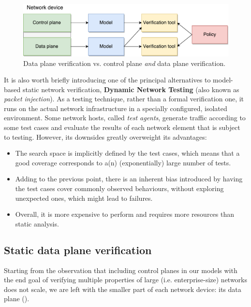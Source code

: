 \begin{figure}[h]
  \centering
  \captionsetup{justification=centering}
  \includegraphics[scale=0.5]{assets/img/control-data}
  \caption{Data plane verification vs. control plane \emph{and} data plane
  verification.}
  \label{fig:control-data-verif}
\end{figure}

It is also worth briefly introducing one of the principal alternatives to
model-based static network verification, \textbf{Dynamic Network Testing} (also
known as \emph{packet injection}). As a testing technique, rather than a formal
verification one, it runs on the actual network infrastructure in a specially
configured, isolated environment.  Some network hosts, called \emph{test
agents}, generate traffic according to some test cases and evaluate the results
of each network element that is subject to testing.  However, its downsides
greatly overweight its advantages:

\begin{itemize}
  \item The search space is implicitly defined by the test cases, which means
    that a good coverage corresponds to a(n) (exponentially) large number of
    tests.
  \item Adding to the previous point, there is an inherent bias introduced by
    having the test cases cover commonly observed behaviours, without exploring
    unexpected ones, which might lead to failures.
  \item Overall, it is more expensive to perform and requires more resources
    than static analysis.
\end{itemize}


\subsection{Static data plane verification}\label{sub-sec:static-dp-verif}

Starting from the observation that including control planes in our models with
the end goal of verifying multiple properties of large (i.e.  enterprise-size)
networks does not scale, we are left with the smaller part of each network
device: its data plane ().

